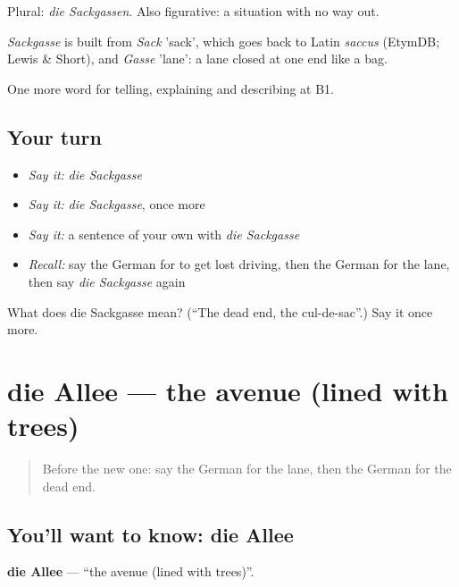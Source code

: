 Plural: \emph{die Sackgassen}. Also figurative: a situation with no way out.

\begin{cousinweb}
\emph{Sackgasse} is built from \emph{Sack} 'sack', which goes back to Latin \emph{saccus} (EtymDB; Lewis \& Short), and \emph{Gasse} 'lane': a lane closed at one end like a bag.
\end{cousinweb}

\begin{grammarlens}[title={What you've built}]
One more word for telling, explaining and describing at B1.
\end{grammarlens}

\subsection*{Your turn}
\begin{itemize}
\raggedright
  \item \emph{Say it:} \emph{die Sackgasse}
  \item \emph{Say it:} \emph{die Sackgasse}, once more
  \item \emph{Say it:} a sentence of your own with \emph{die Sackgasse}
  \item \emph{Recall:} say the German for to get lost driving, then the German for the lane, then say \emph{die Sackgasse} again
\end{itemize}

\begin{tcolorbox}[breakable,colback=teal!4,colframe=teal!35!black,title={Before you move on}]
What does die Sackgasse mean? (\textquotedblleft{}The dead end, the cul-de-sac\textquotedblright{}.) Say it once more.
\end{tcolorbox}
\section[die Allee]{die Allee — the avenue (lined with trees)}

\label{lesson:GE-C436-allee}



\begin{quote}
Before the new one: say the German for the lane, then the German for the dead end.
\end{quote}

\subsection*{You'll want to know: die Allee}
\textbf{die Allee} — \textquotedblleft{}the avenue (lined with trees)\textquotedblright{}.

